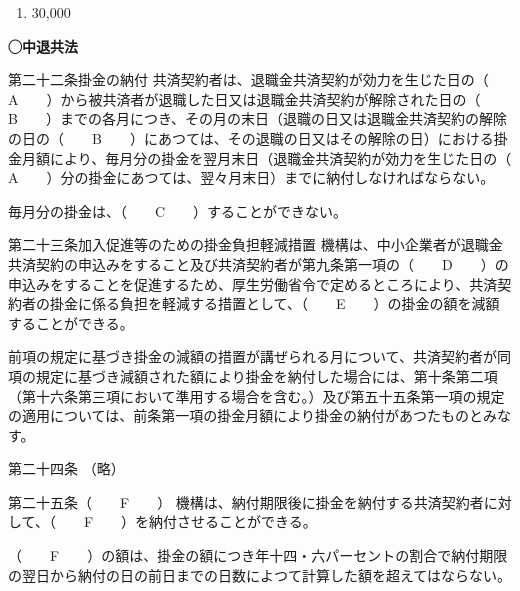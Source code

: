 \begin{answerbox}
  \begin{enumerate}[A:]
    \item 30,000
  \end{enumerate}
\end{answerbox}


\begin{fillblank}[数理人試験 2022 問題1 設問5]
  \noindent \textbf{◯中退共法}
  \begin{lawstructure}
    \begin{lawarticle}{第二十二条}{掛金の納付}
      共済契約者は、退職金共済契約が効力を生じた日の（　　A　　）から被共済者が退職した日又は退職金共済契約が解除された日の（　　B　　）までの各月につき、その月の末日（退職の日又は退職金共済契約の解除の日の（　　B　　）にあつては、その退職の日又はその解除の日）における掛金月額により、毎月分の掛金を翌月末日（退職金共済契約が効力を生じた日の（　　A　　）分の掛金にあつては、翌々月末日）までに納付しなければならない。

      毎月分の掛金は、（　　C　　）することができない。
    \end{lawarticle}


    \begin{lawarticle}{第二十三条}{加入促進等のための掛金負担軽減措置}
      機構は、中小企業者が退職金共済契約の申込みをすること及び共済契約者が第九条第一項の（　　D　　）の申込みをすることを促進するため、厚生労働省令で定めるところにより、共済契約者の掛金に係る負担を軽減する措置として、（　　E　　）の掛金の額を減額することができる。

      前項の規定に基づき掛金の減額の措置が講ぜられる月について、共済契約者が同項の規定に基づき減額された額により掛金を納付した場合には、第十条第二項（第十六条第三項において準用する場合を含む。）及び第五十五条第一項の規定の適用については、前条第一項の掛金月額により掛金の納付があつたものとみなす。
    \end{lawarticle}

      \begin{lawarticle}{第二十四条}{}
        （略）
    \end{lawarticle}
    
    \begin{lawarticle}{第二十五条}{（　　F　　）}
機構は、納付期限後に掛金を納付する共済契約者に対して、（　　F　　）を納付させることができる。

（　　F　　）の額は、掛金の額につき年十四・六パーセントの割合で納付期限の翌日から納付の日の前日までの日数によつて計算した額を超えてはならない。
    \end{lawarticle}

  \end{lawstructure}
\end{fillblank}

